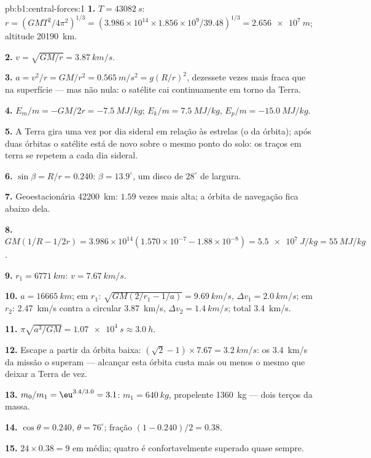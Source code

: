 \begin{solution}{pb:b1:central-forces:1}
\textbf{1.} $T = \qty{43082}{s}$: $r = (GMT^2/4\pi^2)^{1/3} = (3.986\times10^{14}
\times 1.856\times10^9/39.48)^{1/3} = \qty{2.656e7}{m}$; altitude
\qty{20190}{km}.

\textbf{2.} $v = \sqrt{GM/r} = \qty{3.87}{km/s}$.

\textbf{3.} $a = v^2/r = GM/r^2 = \qty{0.565}{m/s^2} = g(R/r)^2$, dezessete
vezes mais fraca que na superfície --- mas não nula: o satélite cai
continuamente em torno da Terra.

\textbf{4.} $E_m/m = -GM/2r = \qty{-7.5}{MJ/kg}$; $E_k/m = \qty{+7.5}{MJ/kg}$,
$E_p/m = \qty{-15.0}{MJ/kg}$.

\textbf{5.} A Terra gira uma vez por dia sideral em relação às estrelas
(o  da órbita); após duas órbitas o satélite está de novo sobre
o mesmo ponto do solo: os traços em terra se repetem a cada dia sideral.

\textbf{6.} $\sin\beta = R/r = 0.240$: $\beta = 13.9^\circ$, um disco de
$28^\circ$ de largura.

\textbf{7.} Geoestacionária \qty{42200}{km}: $1.59$ vezes mais alta; a
órbita de navegação fica abaixo dela.

\textbf{8.} $GM(1/R - 1/2r) = 3.986\times10^{14}(1.570\times10^{-7} - 1.88\times
10^{-8}) = \qty{5.5e7}{J/kg} = \qty{55}{MJ/kg}$.

\textbf{9.} $r_1 = \qty{6771}{km}$: $v = \qty{7.67}{km/s}$.

\textbf{10.} $a = \qty{16665}{km}$; em $r_1$: $\sqrt{GM(2/r_1 - 1/a)} =
\qty{9.69}{km/s}$, $\Delta v_1 = \qty{2.0}{km/s}$; em $r_2$: \qty{2.47}{km/s}
contra a circular \qty{3.87}{km/s}, $\Delta v_2 = \qty{1.4}{km/s}$; total
\qty{3.4}{km/s}.

\textbf{11.} $\pi\sqrt{a^3/GM} = \qty{1.07e4}{s} \approx \qty{3.0}{h}$.

\textbf{12.} Escape a partir da órbita baixa: $(\sqrt2 - 1)\times 7.67 = \qty{3.2}{km/s}$:
os \qty{3.4}{km/s} da missão o superam --- alcançar esta órbita custa
mais ou menos o mesmo que deixar a Terra de vez.

\textbf{13.} $m_0/m_1 = \eu^{3.4/3.0} = 3.1$: $m_1 = \qty{640}{kg}$,
propelente \qty{1360}{kg} --- dois terços da massa.

\textbf{14.} $\cos\theta = 0.240$, $\theta = 76^\circ$; fração $(1 - 0.240)/2
= 0.38$.

\textbf{15.} $24 \times 0.38 = 9$ em média; quatro é confortavelmente
superado quase sempre.


\end{solution}
